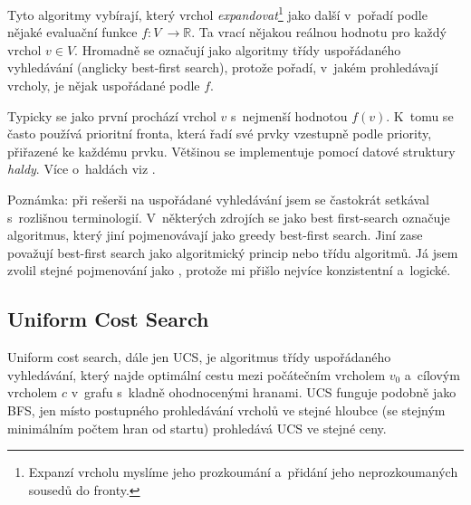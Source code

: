 \documentclass[12pt]{report}			%
\begin{document}
			
			Tyto algoritmy vybírají, který vrchol \emph{expandovat}\footnote{Expanzí vrcholu myslíme jeho prozkoumání a~přidání jeho neprozkoumaných sousedů do fronty.} jako další v~pořadí podle nějaké evaluační funkce $f : V~\rightarrow \mathbb{R}$. Ta vrací nějakou reálnou hodnotu pro každý vrchol $v \in V$. 
			Hromadně se označují jako algoritmy třídy uspořádaného vyhledávání (anglicky best-first search), protože pořadí, v~jakém prohledávají vrcholy, je nějak uspořádané podle $f$.

			Typicky se jako první prochází vrchol $v$ s~nejmenší hodnotou $f(v)$. K~tomu se často používá prioritní fronta, která řadí své prvky vzestupně podle priority, přiřazené ke každému prvku. Většinou se implementuje pomocí datové struktury \emph{haldy}. Více o~haldách viz \cite{pruvodce}.			
			
			Poznámka: při rešerši na uspořádané vyhledávání jsem se častokrát setkával s~rozlišnou terminologií. V~některých zdrojích \cite{carlos} se jako best first-search označuje algoritmus, který jiní \cite{patel_intro} pojmenovávají jako greedy best-first search. Jiní \cite{uhlik,wiki_best_first,felner} zase považují best-first search jako algoritmický princip nebo třídu algoritmů.
			 Já jsem zvolil stejné pojmenování jako \cite{patel_intro, uhlik, felner}, protože mi přišlo nejvíce konzistentní a~logické.
			
			
			

			\subsection{Uniform Cost Search}
			Uniform cost search, dále jen UCS, je algoritmus třídy uspořádaného vyhledávání, který najde optimální %
			cestu mezi počátečním vrcholem $v_0$ a~cílovým vrcholem $c$ v~grafu s~kladně ohodnocenými hranami. 
			UCS funguje podobně jako BFS, jen místo postupného prohledávání vrcholů ve stejné hloubce (se stejným minimálním počtem hran od startu) prohledává UCS ve  stejné ceny.
			
\end{document}
